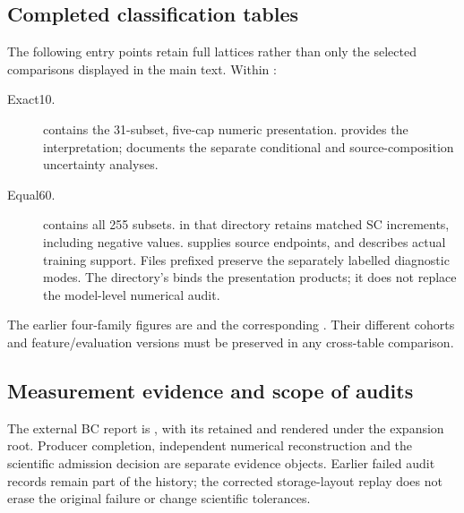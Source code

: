 \subsection{Completed classification tables}
The following entry points retain full lattices rather than only the
selected comparisons displayed in the main text. Within
:
\begin{description}
\item[Exact10.] 
contains the 31-subset, five-cap numeric presentation.
provides the interpretation; 
documents the separate conditional and source-composition uncertainty analyses.
\item[Equal60.] 
contains all 255 subsets.  in that
directory retains matched SC increments, including negative values.
 supplies source endpoints,
and  describes actual training support.
Files prefixed  preserve the separately labelled
diagnostic modes. The directory's  binds the presentation
products; it does not replace the model-level numerical audit.
\end{description}

The earlier four-family figures are
and the corresponding . Their different cohorts
and feature/evaluation versions must be preserved in any cross-table comparison.

\subsection{Measurement evidence and scope of audits}
The external BC report is
,
with its retained  and rendered
 under the expansion
root. Producer completion, independent numerical reconstruction and the
scientific admission decision are separate evidence objects. Earlier failed
audit records remain part of the history; the corrected storage-layout
replay does not erase the original failure or change scientific tolerances.

